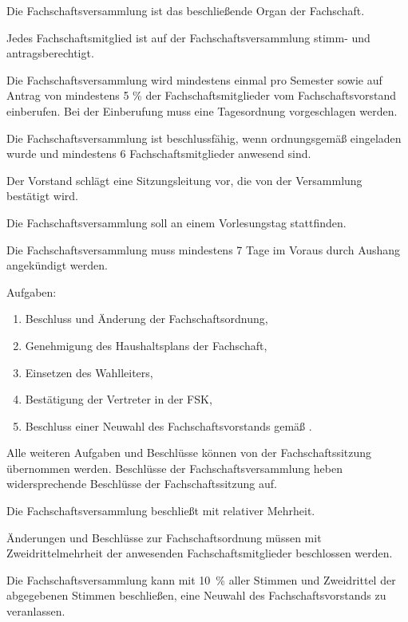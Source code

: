 \documentclass[a4paper, parskip=half, numbers=noenddot]{scrartcl}
\begin{document}
\begin{contract}
%
%

%
\label{fachschaft:vv}

Die Fachschaftsversammlung ist das beschließende Organ der Fachschaft.

Jedes Fachschaftsmitglied ist auf der Fachschaftsversammlung stimm- und antragsberechtigt.

Die Fachschaftsversammlung wird mindestens einmal pro Semester sowie auf Antrag von mindestens 5 \% der Fachschaftsmitglieder vom Fachschaftsvorstand einberufen. Bei der Einberufung muss eine Tagesordnung vorgeschlagen werden.

Die Fachschaftsversammlung ist beschlussfähig, wenn ordnungsgemäß eingeladen wurde und mindestens 6 Fachschaftsmitglieder anwesend sind.

Der Vorstand schlägt eine Sitzungsleitung vor, die von der Versammlung bestätigt wird.

Die Fachschaftsversammlung soll an einem Vorlesungstag stattfinden.

Die Fachschaftsversammlung muss mindestens 7 Tage im Voraus durch Aushang angekündigt werden.

Aufgaben: \label{fachschaft:vv:kompetenzen}
  \begin{enumerate}
  \item Beschluss und Änderung der Fachschaftsordnung,
  \item Genehmigung des Haushaltsplans der Fachschaft,
  \item Einsetzen des Wahlleiters, \label{fachschaft:vv:wahlleiter}
  \item Bestätigung der Vertreter in der FSK,
  \item Beschluss einer Neuwahl des Fachschaftsvorstands gemäß . \label{fachschaft:vv:kompetenzen:abwahl}
  \end{enumerate}

Alle weiteren Aufgaben und Beschlüsse können von der Fachschaftssitzung übernommen werden. Beschlüsse der Fachschaftsversammlung heben widersprechende Beschlüsse der Fachschaftssitzung auf.

Die Fachschaftsversammlung beschließt mit relativer Mehrheit.

Änderungen und Beschlüsse zur Fachschaftsordnung müssen mit Zweidrittelmehrheit der anwesenden Fachschaftsmitglieder beschlossen werden.

Die Fachschaftsversammlung kann mit 10~\% aller Stimmen und Zweidrittel der abgegebenen Stimmen be\-schlie\-ßen, eine Neuwahl des Fach\-schaftsvor\-stands zu veranlassen\label{fachschaft:vv:wahl}.


\end{contract}
\end{document}
